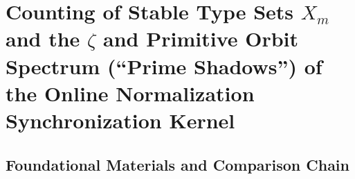 \section{Counting of Stable Type Sets \texorpdfstring{$X_m$}{X\_m} and the \texorpdfstring{$\zeta$}{zeta} and Primitive Orbit Spectrum (``Prime Shadows'') of the Online Normalization Synchronization Kernel}
\label{app:sync-kernel}



\subsection{Foundational Materials and Comparison Chain}









